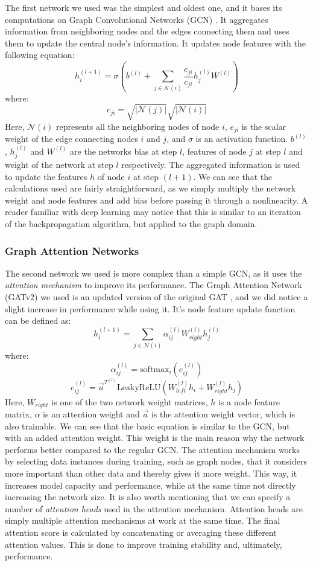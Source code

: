 \documentclass[times, utf8, diplomski, english]{fer_eng}
\begin{document}
The first network we used was the simplest and oldest one, and it bases its computations on Graph Convolutional Networks (GCN) \cite{GCN}. It aggregates information from neighboring nodes and the edges connecting them and uses them to update the central node's information. It updates node features with the following equation:
\[ h_i^{(l+1)} = \sigma (b^{(l)} + \sum_{j \in \mathcal{N}(i)} \frac{e_{ji}}{c_{ji}} h_j^{(l)} W^{(l)} ) \]
where:
\[ c_{ji} = \sqrt{|\mathcal{N}(j)|} \sqrt{|\mathcal{N}(i)|} \]
Here, $\mathcal{N}(i)$ represents all the neighboring nodes of node $i$, $e_{ji}$ is the scalar weight of the edge connecting nodes $i$ and $j$, and $\sigma$ is an activation function. $b^{(l)}$, $h_j^{(l)}$ and $W^{(l)}$ are the networks bias at step $l$, features of node $j$ at step $l$ and weight of the network at step $l$ respectively. The aggregated information is used to update the features $h$ of node $i$ at step $(l+1)$. We can see that the calculations used are fairly straightforward, as we simply multiply the network weight and node features and add bias before passing it through a nonlinearity. A reader familiar with deep learning may notice that this is similar to an iteration of the backpropagation algorithm, but applied to the graph domain.

\subsubsection{Graph Attention Networks}
\label{subsubsec:graph attention networks}

The second network we used is more complex than a simple GCN, as it uses the \textit{attention mechanism} \cite{attention} to improve its performance. The Graph Attention Network (GATv2) \cite{GATv2} we used is an updated version of the original GAT \cite{GAT}, and we did notice a slight increase in performance while using it. It's node feature update function can be defined as:
\[ h_i^{(l+1)} = \sum_{j \in \mathcal{N}(i)} \alpha_{ij}^{(l)} W_{right}^{(l)} h_j^{(l)} \]
where:
\[ \alpha_{ij}^{(l)} = \mathrm{softmax}_i (e_{ij}^{(l)}) \]
\[ e_{ij}^{(l)} = \vec{a}^{T^{(l)}} \mathrm{LeakyReLU} (W_{left}^{(l)} h_i + W_{right}^{(l)} h_j) \]
Here, $W_{right}$ is one of the two network weight matrices, $h$ is a node feature matrix, $\alpha$ is an attention weight and $\vec{a}$ is the attention weight vector, which is also trainable. We can see that the basic equation is similar to the GCN, but with an added attention weight. This weight is the main reason why the network performs better compared to the regular GCN. The attention mechanism works by selecting data instances during training, such as graph nodes, that it considers more important than other data and thereby gives it more weight. This way, it increases model capacity and performance, while at the same time not directly increasing the network size. It is also worth mentioning that we can specify a number of \textit{attention heads} used in the attention mechanism. Attention heads are simply multiple attention mechanisms at work at the same time. The final attention score is calculated by concatenating or averaging these different attention values. This is done to improve training stability and, ultimately, performance.
\end{document}
